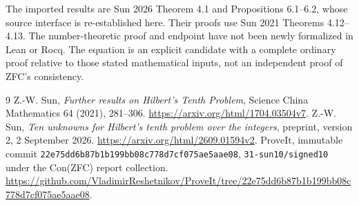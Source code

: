 \documentclass[11pt]{article}
\begin{document}
The imported results are Sun 2026 Theorem 4.1 and Propositions 6.1--6.2,
whose source interface is re-established here. Their proofs use Sun 2021
Theorems 4.12--4.13. The number-theoretic proof and endpoint have not been
newly formalized in Lean or Rocq. The equation is an explicit candidate
with a complete ordinary proof relative to those stated mathematical
inputs, not an independent proof of ZFC's consistency.

\begin{thebibliography}{9}
 Z.-W. Sun, \emph{Further results on Hilbert's Tenth Problem},
Science China Mathematics 64 (2021), 281--306.
\url{https://arxiv.org/html/1704.03504v7}.
 Z.-W. Sun, \emph{Ten unknowns for Hilbert's tenth problem
over the integers}, preprint, version 2, 2 September 2026.
\url{https://arxiv.org/html/2609.01594v2}.
 ProveIt, immutable commit
\texttt{22e75dd6b87b1b199bb08c778d7cf075ae5aae08},
\texttt{31-sun10/signed10} under the Con(ZFC) report collection.
\url{https://github.com/VladimirReshetnikov/ProveIt/tree/22e75dd6b87b1b199bb08c778d7cf075ae5aae08}.
\end{thebibliography}
\end{document}
